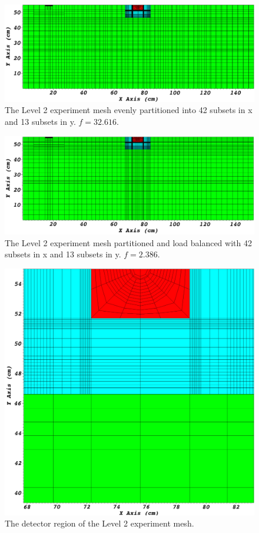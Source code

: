 \begin{figure}[ht]
\centering
\includegraphics[scale=0.3]{../../figures/level2_42x13.png}
\caption{The Level 2 experiment mesh evenly partitioned into 42 subsets in x and 13 subsets in y. $f = 32.616$.}
\label{level2_42x13}
\end{figure}

\begin{figure}[ht]
\centering
\includegraphics[scale=0.3]{../../figures/level2_42x13_balanced.png}
\caption{The Level 2 experiment mesh partitioned and load balanced with 42 subsets in x and 13 subsets in y. $f = 2.386$.}
\label{level2_42x13_balanced}
\end{figure}

\begin{figure}[ht]
\centering
\includegraphics[scale=0.15]{../../figures/level2_nocut_zoom.png}
\caption{The detector region of the Level 2 experiment mesh.}
\label{level2_nocut_zoom}
\end{figure}

